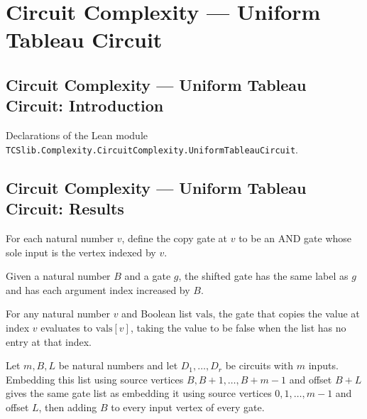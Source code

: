\section{Circuit Complexity --- Uniform Tableau Circuit}
\subsection*{Circuit Complexity --- Uniform Tableau Circuit: Introduction}

Declarations of the Lean module \texttt{TCSlib.Complexity.CircuitComplexity.UniformTableauCircuit}.

\subsection*{Circuit Complexity --- Uniform Tableau Circuit: Results}

\begin{definition}
\label{BoolCircuit.copyGate}
\leanok
{}
For each natural number $v$, define the copy gate at $v$ to be an AND gate whose sole
input is the vertex indexed by $v$.
\end{definition}

\begin{definition}
\label{BoolCircuit.shiftGate}
\leanok
{}
Given a natural number $B$ and a gate $g$, the shifted gate has the same label as $g$
and has each argument index increased by $B$.
\end{definition}

\begin{theorem}
\label{BoolCircuit.copyGate_eval}
\leanok
{}
For any natural number $v$ and Boolean list $\mathrm{vals}$, the gate that copies the
value at index $v$ evaluates to $\mathrm{vals}[v]$, taking the value to be false when
the list has no entry at that index.
\end{theorem}

\begin{theorem}
\label{BoolCircuit.embedAll_range'_eq}
\leanok
{}
Let $m,B,L$ be natural numbers and let $D_1,\ldots,D_r$ be circuits with $m$ inputs.
Embedding this list using source vertices $B,B+1,\ldots,B+m-1$ and offset $B+L$ gives
the same gate list as embedding it using source vertices $0,1,\ldots,m-1$ and offset
$L$, then adding $B$ to every input vertex of every gate.
\end{theorem}

